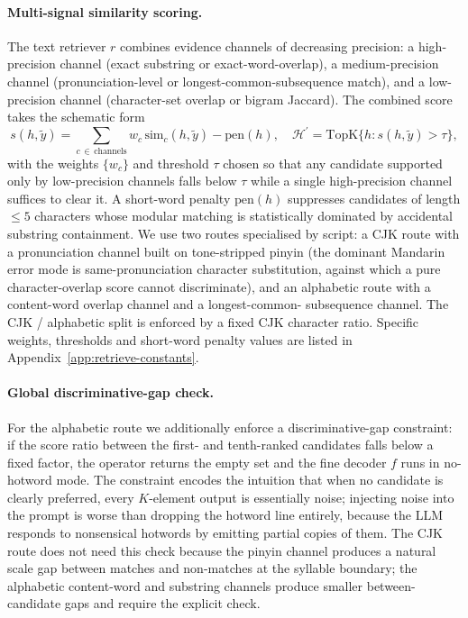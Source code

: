 \paragraph{Multi-signal similarity scoring.}
The text retriever $r$ combines evidence channels of decreasing
precision: a high-precision channel (exact substring or
exact-word-overlap), a medium-precision channel
(pronunciation-level or longest-common-subsequence match), and a
low-precision channel (character-set overlap or bigram Jaccard).
The combined score takes the schematic form
\begin{equation}
  s(h, \tilde{y}) = \sum_{c\,\in\,\text{channels}} w_c\,
    \mathrm{sim}_c(h, \tilde{y}) - \mathrm{pen}(h),\quad
  \mathcal{H}^\prime = \mathrm{TopK}\{h : s(h, \tilde{y}) > \tau\},
  \label{eq:retrieve-score}
\end{equation}
with the weights $\{w_c\}$ and threshold $\tau$ chosen so that any
candidate supported only by low-precision channels falls below
$\tau$ while a single high-precision channel suffices to clear it.
A short-word penalty $\mathrm{pen}(h)$ suppresses candidates of
length $\le 5$ characters whose modular matching is statistically
dominated by accidental substring containment. We use two routes
specialised by script: a CJK route with a pronunciation channel
built on tone-stripped pinyin (the dominant Mandarin error mode is
same-pronunciation character substitution, against which a pure
character-overlap score cannot discriminate), and an alphabetic
route with a content-word overlap channel and a longest-common-
subsequence channel. The CJK / alphabetic split is enforced by a
fixed CJK character ratio. Specific weights, thresholds and
short-word penalty values are listed in
Appendix~\ref{app:retrieve-constants}.

\paragraph{Global discriminative-gap check.}
For the alphabetic route we additionally enforce a
discriminative-gap constraint: if the score ratio between the
first- and tenth-ranked candidates falls below a fixed factor, the
operator returns the empty set and the fine decoder $f$ runs in
no-hotword mode. The constraint encodes the intuition that when no
candidate is clearly preferred, every $K$-element output is
essentially noise; injecting noise into the prompt is worse than
dropping the hotword line entirely, because the LLM responds to
nonsensical hotwords by emitting partial copies of them. The CJK
route does not need this check because the pinyin channel
produces a natural scale gap between matches and non-matches at the
syllable boundary; the alphabetic content-word and substring
channels produce smaller between-candidate gaps and require the
explicit check.

